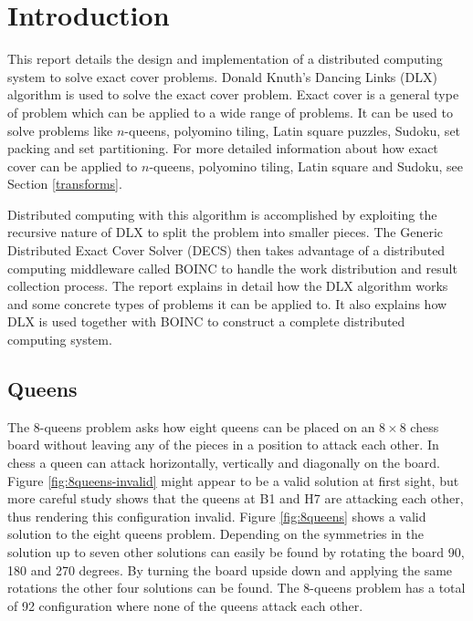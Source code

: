 
\chapter{Introduction}

This report details the design and implementation of a distributed computing system to solve exact cover problems.
Donald Knuth's Dancing Links (DLX) algorithm \cite{knuth00dancing} is used to solve the exact cover problem.
Exact cover is a general type of problem which can be applied to a wide range of problems.
It can be used to solve problems like $n$-queens, polyomino tiling, Latin square puzzles, Sudoku, set packing and set partitioning.
For more detailed information about how exact cover can be applied to $n$-queens, polyomino tiling, Latin square and Sudoku, see Section \ref{transforms}.

Distributed computing with this algorithm is accomplished by exploiting the recursive nature of DLX to split the problem into smaller pieces.
The Generic Distributed Exact Cover Solver (DECS) then takes advantage of a distributed computing middleware called BOINC \cite{boinc} to handle the work distribution and result collection process.
The report explains in detail how the DLX algorithm works and some concrete types of problems it can be applied to.
It also explains how DLX is used together with BOINC to construct a complete distributed computing system.



\section{Queens}
\label{intro_queens}

The 8-queens problem asks how eight queens can be placed on an $8 \times 8$ chess board without leaving any of the pieces in a position to attack each other.
In chess a queen can attack horizontally, vertically and diagonally on the board.
Figure \ref{fig:8queens-invalid} might appear to be a valid solution at first sight, but more careful study shows that the queens at B1 and H7 are attacking each other, thus rendering this configuration invalid.
Figure \ref{fig:8queens} shows a valid solution to the eight queens problem.
Depending on the symmetries in the solution up to seven other solutions can easily be found by rotating the board 90, 180 and 270 degrees.
By turning the board upside down and applying the same rotations the other four solutions can be found.
The 8-queens problem has a total of 92 configuration where none of the queens attack each other.

